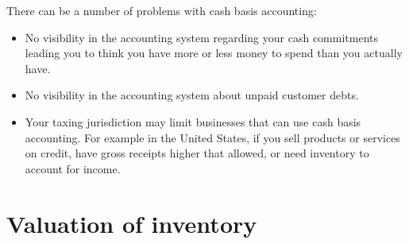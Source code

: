 There can be a number of problems with \gls{cash basis} accounting:
\begin{itemize}
	\item No visibility in the accounting system regarding your cash commitments leading
	you to think you have more or less money to spend than you actually have.
	\item No visibility in the accounting system about unpaid customer debts.
	\item Your taxing jurisdiction may limit businesses that can use cash basis accounting.
	For example in the United States, if you sell products or services on credit,
	have gross receipts higher that allowed, or need inventory to account for income.
\end{itemize}

\section{Valuation of inventory}
\label{sec-accounting-valuation-inventory}


